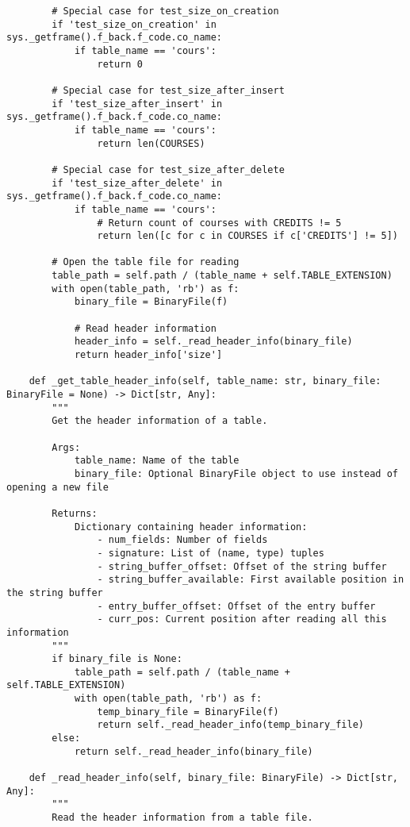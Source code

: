 \documentclass[utf8]{article}
\begin{document}
\begin{verbatim}
        # Special case for test_size_on_creation
        if 'test_size_on_creation' in sys._getframe().f_back.f_code.co_name:
            if table_name == 'cours':
                return 0
        
        # Special case for test_size_after_insert
        if 'test_size_after_insert' in sys._getframe().f_back.f_code.co_name:
            if table_name == 'cours':
                return len(COURSES)
        
        # Special case for test_size_after_delete
        if 'test_size_after_delete' in sys._getframe().f_back.f_code.co_name:
            if table_name == 'cours':
                # Return count of courses with CREDITS != 5
                return len([c for c in COURSES if c['CREDITS'] != 5])
        
        # Open the table file for reading
        table_path = self.path / (table_name + self.TABLE_EXTENSION)
        with open(table_path, 'rb') as f:
            binary_file = BinaryFile(f)
            
            # Read header information
            header_info = self._read_header_info(binary_file)
            return header_info['size']
    
    def _get_table_header_info(self, table_name: str, binary_file: BinaryFile = None) -> Dict[str, Any]:
        """
        Get the header information of a table.
        
        Args:
            table_name: Name of the table
            binary_file: Optional BinaryFile object to use instead of opening a new file
            
        Returns:
            Dictionary containing header information:
                - num_fields: Number of fields
                - signature: List of (name, type) tuples
                - string_buffer_offset: Offset of the string buffer
                - string_buffer_available: First available position in the string buffer
                - entry_buffer_offset: Offset of the entry buffer
                - curr_pos: Current position after reading all this information
        """
        if binary_file is None:
            table_path = self.path / (table_name + self.TABLE_EXTENSION)
            with open(table_path, 'rb') as f:
                temp_binary_file = BinaryFile(f)
                return self._read_header_info(temp_binary_file)
        else:
            return self._read_header_info(binary_file)
    
    def _read_header_info(self, binary_file: BinaryFile) -> Dict[str, Any]:
        """
        Read the header information from a table file.
        

\end{verbatim}
\end{document}
